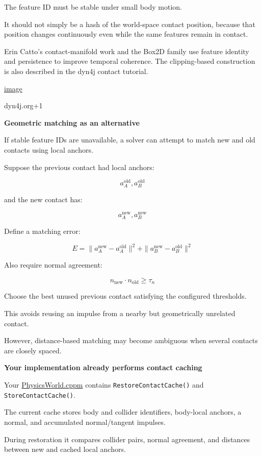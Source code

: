 The feature ID must be stable under small body motion.

It should not simply be a hash of the world-space contact position, because that position changes continuously even while the same features remain in contact.

Erin Catto's contact-manifold work and the Box2D family use feature identity and persistence to improve temporal coherence. The clipping-based construction is also described in the dyn4j contact tutorial. 

\href{https://www.google.com/s2/favicons?domain=https://dyn4j.org&sz=32}{image}

dyn4j.org+1

\textbf{Geometric matching as an alternative}

If stable feature IDs are unavailable, a solver can attempt to match new and old contacts using local anchors.

Suppose the previous contact had local anchors:

\[
a_A^{\mathrm{old}},a_B^{\mathrm{old}}
\]

and the new contact has:

\[
a_A^{\mathrm{new}},a_B^{\mathrm{new}}
\]

Define a matching error:

\[
\boxed{ E= \|a_A^{\mathrm{new}}-a_A^{\mathrm{old}}\|^2+ \|a_B^{\mathrm{new}}-a_B^{\mathrm{old}}\|^2 }
\]

Also require normal agreement:

\[
\boxed{ n_{\mathrm{new}}\cdot n_{\mathrm{old}}\ge\tau_n }
\]

Choose the best unused previous contact satisfying the configured thresholds.

This avoids reusing an impulse from a nearby but geometrically unrelated contact.

However, distance-based matching may become ambiguous when several contacts are closely spaced.

\textbf{Your implementation already performs contact caching}

Your \href{https://github.com/swayam8624/KairoPhysicsEngine/blob/main/PhysicsWorld.cppm?utm_source=chatgpt.com}{PhysicsWorld.cppm} contains \texttt{RestoreContactCache()} and \texttt{StoreContactCache()}.

The current cache stores body and collider identifiers, body-local anchors, a normal, and accumulated normal/tangent impulses.

During restoration it compares collider pairs, normal agreement, and distances between new and cached local anchors.

